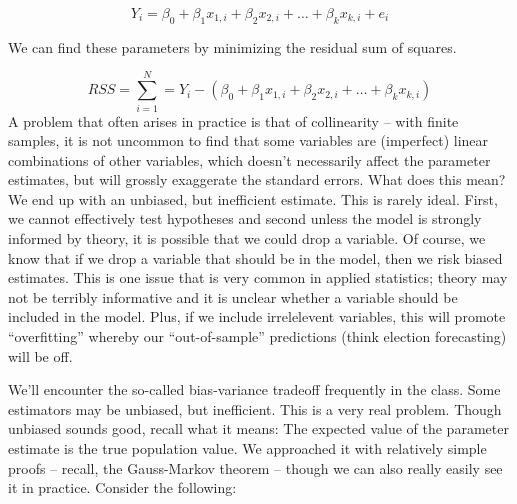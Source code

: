 \documentclass[
]{book}
\begin{document}
\[Y_i=\beta_0+\beta_1 x_{1,i}+\beta_2 x_{2,i}+\dots+\beta_k x_{k,i}+e_i\]

We can find these parameters by minimizing the residual sum of squares.

\[RSS=\sum_{i=1}^N=Y_i-(\beta_0+\beta_1 x_{1,i}+\beta_2 x_{2,i}+\dots+\beta_k x_{k,i})\]
A problem that often arises in practice is that of collinearity -- with finite samples, it is not uncommon to find that some variables are (imperfect) linear combinations of other variables, which doesn't necessarily affect the parameter estimates, but will grossly exaggerate the standard errors. What does this mean? We end up with an unbiased, but inefficient estimate. This is rarely ideal. First, we cannot effectively test hypotheses and second unless the model is strongly informed by theory, it is possible that we could drop a variable. Of course, we know that if we drop a variable that should be in the model, then we risk biased estimates. This is one issue that is very common in applied statistics; theory may not be terribly informative and it is unclear whether a variable should be included in the model. Plus, if we include irrelelevent variables, this will promote ``overfitting'' whereby our ``out-of-sample'' predictions (think election forecasting) will be off.

We'll encounter the so-called bias-variance tradeoff frequently in the class. Some estimators may be unbiased, but inefficient. This is a very real problem. Though unbiased sounds good, recall what it means: The expected value of the parameter estimate is the true population value. We approached it with relatively simple proofs -- recall, the Gauss-Markov theorem -- though we can also really easily see it in practice. Consider the following:

  
\end{document}
